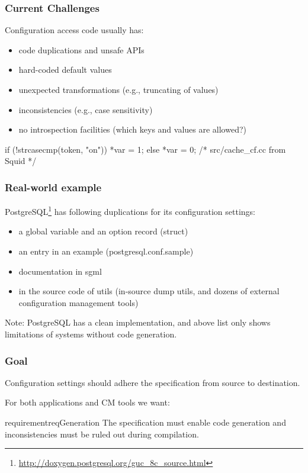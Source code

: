 \begin{frame}[fragile]
	\frametitle{Current Challenges}
	Configuration access code usually has:
	\pause
	\begin{itemize}
	\item code duplications and unsafe APIs
	\item hard-coded default values
	\item unexpected transformations (e.g., truncating of values)
	\item inconsistencies (e.g., case sensitivity)
	\item no introspection facilities (which keys and values are allowed?)
	\end{itemize}
	\begin{example}
	\begin{code}[gobble=4,language=C++]
	if (!strcasecmp(token, "on")) {
		*var = 1;
	} else {
		*var = 0;
	} /* src/cache_cf.cc from Squid */
	\end{code}\end{example}
\end{frame}

\begin{frame}[fragile]
	\frametitle{Real-world example}
	PostgreSQL\footnote{\url{http://doxygen.postgresql.org/guc_8c_source.html}} has following duplications for its configuration settings:
	\begin{itemize}
	\item a global variable and an option record (struct)
	\item an entry in an example (postgresql.conf.sample)
	\item documentation in sgml
	\item in the source code of utils (in-source dump utils, and dozens of external configuration management tools)
	\end{itemize}
	\pause
	\vspace{1em}
	Note: PostgreSQL has a clean implementation, and above list only shows limitations of systems without code generation.
\end{frame}

\begin{frame}
	\frametitle{Goal}

	\begin{goal}
	Configuration settings should adhere the specification from source to destination.
	\end{goal}

	For both applications and CM tools we want:

	\begin{restatable}{requirement}{reqGeneration}
	The specification must enable code generation and inconsistencies must be ruled out during compilation.
	\end{restatable}
\end{frame}


